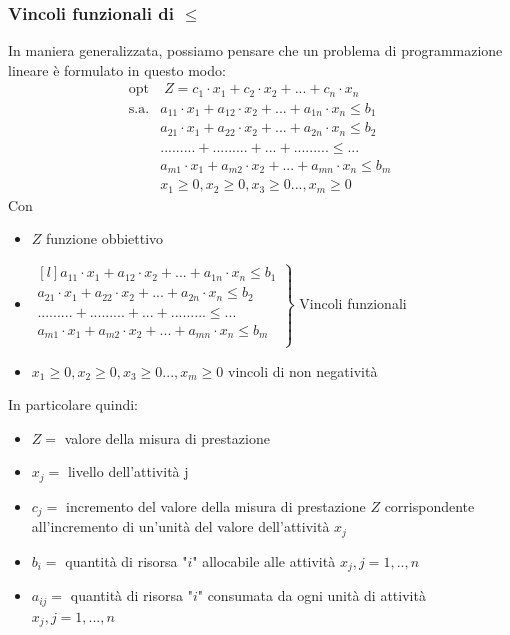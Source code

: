 \documentclass[12pt]{article}
\begin{document}
\subsubsection{Vincoli funzionali di $\leq$}
In maniera generalizzata, possiamo pensare che un problema di programmazione lineare è formulato in questo modo:
\begin{equation*}
    \begin{array}{ll}
    \displaystyle \textrm{opt} & \; Z = c_1 \cdot x_1 + c_2 \cdot x_2 +...+ c_n \cdot x_n\\
    \textrm{s.a.} & a_{11} \cdot x_1 + a_{12} \cdot x_2 +...+ a_{1n} \cdot x_n \leq b_1 \\
    \phantom{} & a_{21} \cdot x_1 + a_{22} \cdot x_2 +...+ a_{2n} \cdot x_n \leq b_2 \\
    \phantom{} &... ... ... + ... ... ... + ... + ... ... ... \leq ... \\
    \phantom{} & a_{m1} \cdot x_1 + a_{m2} \cdot x_2 +...+ a_{mn} \cdot x_n \leq b_m \\
    \phantom{} &x_1 \geq 0, x_2 \geq 0, x_3 \geq 0 ..., x_m \geq 0
    \end{array}
\end{equation*}
Con
\begin{itemize}
    \item $Z$ funzione obbiettivo
    \item $\left. \begin{matrix*}[l]
    a_{11} \cdot x_1 + a_{12} \cdot x_2 +...+ a_{1n} \cdot x_n \leq b_1 \\
    a_{21} \cdot x_1 + a_{22} \cdot x_2 +...+ a_{2n} \cdot x_n \leq b_2 \\
    ... ... ... + ... ... ... + ... + ... ... ... \leq ... \\
    a_{m1} \cdot x_1 + a_{m2} \cdot x_2 +...+ a_{mn} \cdot x_n \leq b_m \\
    \end{matrix*}\right\}$ Vincoli funzionali
    \item $x_1 \geq 0, x_2 \geq 0, x_3 \geq 0 ..., x_m \geq 0$ vincoli di non negatività
\end{itemize}
In particolare quindi:
\begin{itemize}
    \item $Z =$ valore della misura di prestazione
    \item $x_j =$ livello dell'attività j
    \item $c_j =$ incremento del valore della misura di prestazione $Z$ corrispondente all'incremento di un'unità del valore dell'attività $x_j$
    \item $b_i =$ quantità di risorsa "$i$" allocabile alle attività $x_j, j = 1,..,n$
    \item $a_{ij} =$ quantità di risorsa "$i$" consumata da ogni unità di attività $x_j, j=1,...,n$
\end{itemize}
\end{document}
